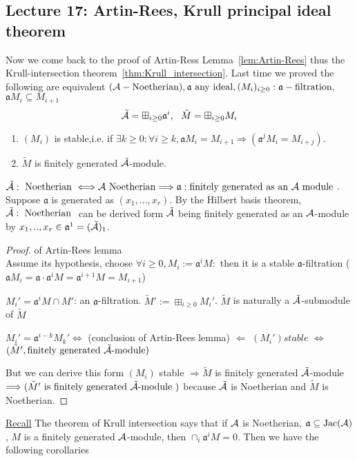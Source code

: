 \documentclass[11pt]{article}
\newcommand{\sca}{{\mathfrak a}}
\newcommand{\cala}{{\cal A}}
\newcommand{\Lrta}{\Longrightarrow}
\newcommand{\Llta}{\Longleftarrow}
\newcommand{\Llrta}{\Longleftrightarrow}
\begin{document}
\subsection{Lecture 17: Artin-Rees, Krull principal ideal theorem}
Now we come back to the proof of Artin-Ress Lemma~\ref{lem:Artin-Rees} thus the Krull-intersection theorem~\ref{thm:Krull_intersection}. Last time we proved the following are equivalent $(\cala-\text{Noetherian}), \sca\text{ any ideal}, (M_i)_{i\geq 0}:\sca-\text{filtration}, $ $\sca M_i\subseteq M_{i+1}$\\
$$
\tilde{\cala}=\boxplus_{i\geq 0}\sca^i,\ \  \tilde{M}=\boxplus_{i\geq 0} M_i
$$ 
\begin{enumerate}[label=(\roman*)]
\item $(M_i)$ is stable,i.e.  if $\exists k\geq 0:\forall i\geq k,\sca M_i=M_{i+1}\Lrta(\sca^j M_i=M_{i+j})$.
\item $\tilde{M}$ is finitely generated $\tilde{\cala}$-module.
\end{enumerate}
$\tilde{\cala}:\text{ Noetherian }\Llrta \cala \text{ Noetherian}\Lrta \sca: \text{finitely generated as an $\cala$ module }$. Suppose $\sca$ is generated as $(x_1,...,x_r)$. By the Hilbert basis theorem, $\tilde{\cala}:\text{ Noetherian }$ can be derived form $\tilde{\cala}$ being finitely generated as an $\cala$-module by $x_1,..,x_r\in\sca^1= (\tilde{\cala})_1$.

\begin{proof} of Artin-Rees lemma\\
Assume its hypothesis, choose $\forall i\geq 0, M_i:=\sca^i M:$ then it is a stable $\sca$-filtration ($\sca M_i=\sca\cdot \sca^i M=\sca^{i+1}M=M_{i+1}$)

$M_i'=\sca^i M\cap M'$: an $\sca$-filtration. $\tilde{M}':=\boxplus_{i\geq 0}M_i'$. $\tilde{M}$ is naturally a $\tilde{\cala}$-submodule of $\tilde{M}$

$M_i'=\sca^{i-k}M_k'\Llrta $ (conclusion of Artin-Rees lemma) $\Llta$ $(M_i') stable$ $\Llrta$ $(\tilde{M}',\text{finitely generated $\tilde{\cala}$-module})$

But we can derive this form $(M_i)$ stable $\Lrta\tilde{M} $  is finitely generated $\tilde{\cala}$-module $\Lrta (\tilde{M}'\text{ is finitely generated $\tilde{\cala}$-module })$ because $\tilde{\cala}$ is Noetherian and $\tilde{M}$ is Noetherian.
\end{proof}
\underline{Recall}
The theorem of Krull intersection says that if $\cala$ is Noetherian, $\sca\subseteq \text{Jac}(\cala)$, $M$ is a finitely generated $\cala$-module, then $\cap_i\sca^i M=0$. Then we have the following corollaries
\end{document}
